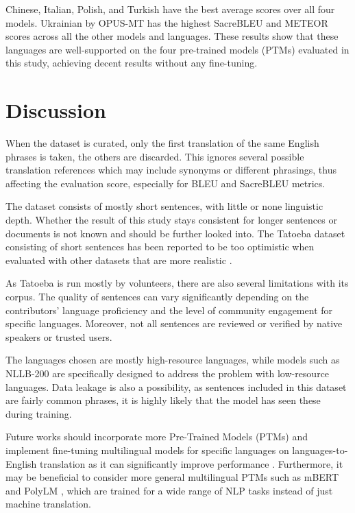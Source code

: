 \documentclass[a4paper, 11pt]{article}
\begin{document}
Chinese, Italian, Polish, and Turkish have the best average scores over all four models. Ukrainian by OPUS-MT has the highest SacreBLEU and METEOR scores across all the other models and languages. These results show that these languages are well-supported on the four pre-trained models (PTMs) evaluated in this study, achieving decent results without any fine-tuning.


\section{Discussion}

When the dataset is curated, only the first translation of the same English phrases is taken, the others are discarded. This ignores several possible translation references which may include synonyms or different phrasings, thus affecting the evaluation score, especially for BLEU and SacreBLEU metrics.

The dataset consists of mostly short sentences, with little or none linguistic depth. Whether the result of this study stays consistent for longer sentences or documents is not known and should be further looked into. The Tatoeba dataset \cite{tiedemann-2020-tatoeba-challenge} consisting of short sentences has been reported to be too optimistic when evaluated with other datasets that are more realistic \cite{tiedemann-2020-opus-mt}.

As Tatoeba \cite{tatoeba} is run mostly by volunteers, there are also several limitations with its corpus. The quality of sentences can vary significantly depending on the contributors' language proficiency and the level of community engagement for specific languages. Moreover, not all sentences are reviewed or verified by native speakers or trusted users.

The languages chosen are mostly high-resource languages, while models such as NLLB-200 \cite{nllb200-2020} are specifically designed to address the problem with low-resource languages. Data leakage is also a possibility, as sentences included in this dataset are fairly common phrases, it is highly likely that the model has seen these during training.

Future works should incorporate more Pre-Trained Models (PTMs) and implement fine-tuning multilingual models for specific languages on languages-to-English translation as it can significantly improve performance \cite{zhang-2023-fine-tuning}. Furthermore, it may be beneficial to consider more general multilingual PTMs such as mBERT \cite{wu-2020-mbert-are-all} and PolyLM \cite{wei-2023-polylm}, which are trained for a wide range of NLP tasks instead of just machine translation.

\printbibliography
\end{document}
